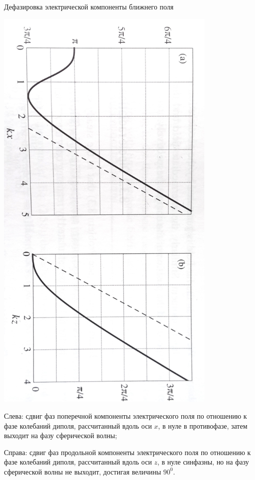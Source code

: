 \documentclass[9pt, compress, xcolor=table]{beamer}
\begin{document}
\begin{frame}{Дефазировка электрической компоненты ближнего поля}

\begin{center}
\includegraphics[width=0.8\textwidth]{phase1}
\end{center}

Слева: сдвиг фаз поперечной компоненты электрического поля по отношению к фазе колебаний диполя, рассчитанный вдоль оси $x$, в нуле в противофазе, затем выходит на фазу сферической волны;

Справа: сдвиг фаз продольной компоненты электрического поля по отношению к фазе колебаний диполя, рассчитанный вдоль оси $z$, в нуле синфазны, но на фазу сферической волны не выходит, достигая величины $90^{0}$.

\end{frame}
\end{document}
